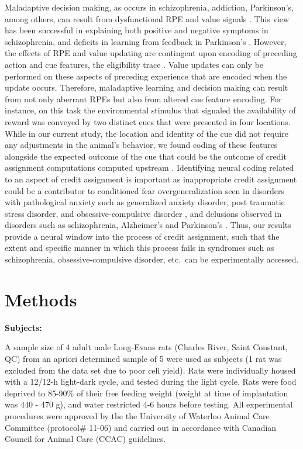 \documentclass[11pt]{article}
\let\cite=\citep
\providecommand{\DIFadd}[1]{{\protect\color{red} \sf #1}} %
\providecommand{\DIFaddbegin}{} %
\providecommand{\DIFaddend}{} %
\newcommand{\DIFaddincludegraphics}[2][]{{\color{red}\fbox{\DIFOincludegraphics[#1]{#2}}}} %
\DeclareRobustCommand{\DIFaddbegin}{\DIFOaddbegin \let\includegraphics\DIFaddincludegraphics} %
\DeclareRobustCommand{\DIFaddend}{\DIFOaddend \let\includegraphics\DIFOincludegraphics} %
\begin{document}
Maladaptive decision making, as occurs in schizophrenia, addiction, Parkinson's, among others, can result from dysfunctional RPE and value signals \cite{Frank2004,Gradin2011,Maia2011}. This view has been successful in explaining both positive and negative symptoms in schizophrenia, and deficits in learning from feedback in Parkinson's \cite{Frank2004,Gradin2011}. However, the effects of RPE and value updating are contingent upon encoding of preceding action and cue features, the eligibility trace \cite{sutton1998,Lee2012}. Value updates can only be performed on these aspects of preceding experience that are encoded when the update occurs. Therefore, maladaptive learning and decision making can result from not only aberrant RPEs but also from altered cue feature encoding. For instance, on this task the environmental stimulus that signaled the availability of reward was conveyed by two distinct cues that were presented in four locations. While in our current study, the location and identity of the cue did not require any adjustments in the animal’s behavior, we found coding of these features alongside the expected outcome of the cue that could be the outcome of credit assignment computations computed upstream \DIFaddbegin \DIFadd{\cite{Chau2015,Akaishi2016,Asaad2017,Noonan2017}}\DIFaddend . Identifying neural coding related to an aspect of credit assignment is important as inappropriate credit assignment could be a contributor to conditioned fear overgeneralization seen in disorders with pathological anxiety such as generalized anxiety disorder, post traumatic stress disorder, and obsessive-compulsive disorder \cite{Kaczkurkin2013,Lissek2014,Kaczkurkin2017}, and delusions observed in disorders such as schizophrenia, Alzheimer's and Parkinson's \cite{Kapur2003,Corlett2010}. Thus, our results provide a neural window into the process of credit assignment, such that the extent and specific manner in which this process fails in syndromes such as schizophrenia, obsessive-compulsive disorder, etc.\ can be experimentally accessed.

\section*{Methods}

{\bf Subjects:}

A sample size of 4 adult male Long-Evans rats (Charles River, Saint Constant, QC) from an apriori determined sample of 5 
were used as subjects (1 rat was excluded from the data set due to poor cell yield). Rats were individually housed with a 12/12-h
light-dark cycle, and tested during the light cycle. Rats were food
deprived to 85-90\% of their free feeding weight (weight at time of
implantation was 440 - 470 g), and water restricted 4-6 hours before
testing. All experimental procedures were approved by the the
University of Waterloo Animal Care Committee (protocol\# 11-06) and
carried out in accordance with Canadian Council for Animal Care (CCAC)
guidelines.
\end{document}
